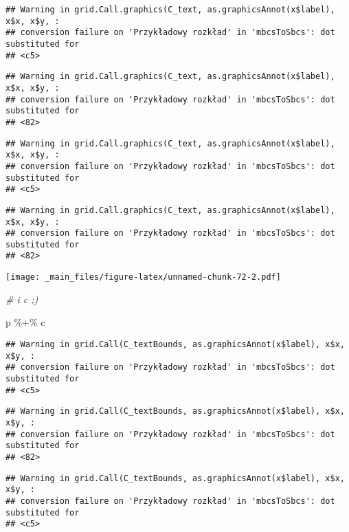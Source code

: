 \documentclass[
]{book}
\newenvironment{Shaded}{\begin{snugshade}}{\end{snugshade}}
\newcommand{\CommentTok}[1]{\textcolor[rgb]{0.56,0.35,0.01}{\textit{#1}}}
\newcommand{\NormalTok}[1]{#1}
\newcommand{\SpecialCharTok}[1]{\textcolor[rgb]{0.00,0.00,0.00}{#1}}
\begin{document}
\begin{verbatim}
## Warning in grid.Call.graphics(C_text, as.graphicsAnnot(x$label), x$x, x$y, :
## conversion failure on 'Przykładowy rozkład' in 'mbcsToSbcs': dot substituted for
## <c5>
\end{verbatim}

\begin{verbatim}
## Warning in grid.Call.graphics(C_text, as.graphicsAnnot(x$label), x$x, x$y, :
## conversion failure on 'Przykładowy rozkład' in 'mbcsToSbcs': dot substituted for
## <82>
\end{verbatim}

\begin{verbatim}
## Warning in grid.Call.graphics(C_text, as.graphicsAnnot(x$label), x$x, x$y, :
## conversion failure on 'Przykładowy rozkład' in 'mbcsToSbcs': dot substituted for
## <c5>
\end{verbatim}

\begin{verbatim}
## Warning in grid.Call.graphics(C_text, as.graphicsAnnot(x$label), x$x, x$y, :
## conversion failure on 'Przykładowy rozkład' in 'mbcsToSbcs': dot substituted for
## <82>
\end{verbatim}

\texttt{[image: \_main\_files/figure-latex/unnamed-chunk-72-2.pdf]}

\begin{Shaded}
\begin{Highlighting}[]
\CommentTok{\# i c ;)}

\NormalTok{p }\SpecialCharTok{\%+\%}\NormalTok{ c}
\end{Highlighting}
\end{Shaded}

\begin{verbatim}
## Warning in grid.Call(C_textBounds, as.graphicsAnnot(x$label), x$x, x$y, :
## conversion failure on 'Przykładowy rozkład' in 'mbcsToSbcs': dot substituted for
## <c5>
\end{verbatim}

\begin{verbatim}
## Warning in grid.Call(C_textBounds, as.graphicsAnnot(x$label), x$x, x$y, :
## conversion failure on 'Przykładowy rozkład' in 'mbcsToSbcs': dot substituted for
## <82>
\end{verbatim}

\begin{verbatim}
## Warning in grid.Call(C_textBounds, as.graphicsAnnot(x$label), x$x, x$y, :
## conversion failure on 'Przykładowy rozkład' in 'mbcsToSbcs': dot substituted for
## <c5>
\end{verbatim}
\end{document}
